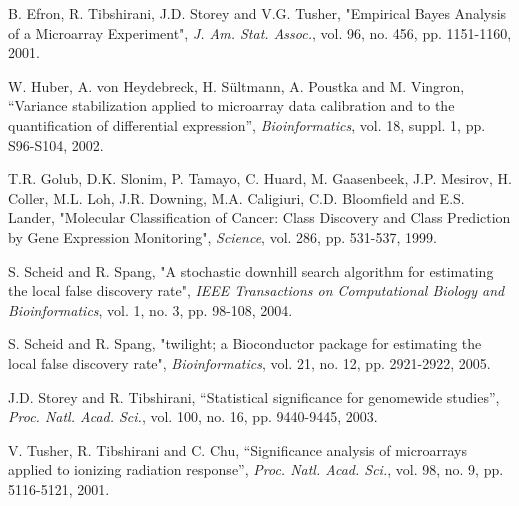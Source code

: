 \documentclass[11pt,a4paper,fleqn]{report}
\begin{document}
\begin{thebibliography}{1}

B. Efron, R. Tibshirani, J.D. Storey and V.G. Tusher, "Empirical Bayes Analysis of a Microarray Experiment", \emph{J. Am. Stat. Assoc.}, vol. 96, no. 456, pp. 1151-1160, 2001.

W. Huber, A. von Heydebreck, H. S{\"u}ltmann, A. Poustka and M. Vingron, ``Variance stabilization applied to microarray data calibration and to the quantification of differential expression'', \emph{Bioinformatics}, vol. 18, suppl. 1, pp. S96-S104, 2002.

T.R. Golub, D.K. Slonim, P. Tamayo, C. Huard, M. Gaasenbeek, J.P. Mesirov, H. Coller, M.L. Loh, J.R. Downing, M.A. Caligiuri, C.D. Bloomfield and E.S. Lander, "Molecular Classification of Cancer: Class Discovery and Class Prediction by Gene Expression Monitoring", \emph{Science}, vol. 286, pp. 531-537, 1999.

S. Scheid and R. Spang, "A stochastic downhill search algorithm for estimating the local false discovery rate", \emph{IEEE Transactions on Computational Biology and Bioinformatics}, vol. 1, no. 3, pp. 98-108, 2004.

S. Scheid and R. Spang, "twilight; a Bioconductor package for estimating the local false discovery rate", \emph{Bioinformatics}, vol. 21, no. 12, pp. 2921-2922, 2005.
       
J.D. Storey and R. Tibshirani, ``Statistical significance for genomewide studies'', \textit{Proc. Natl. Acad. Sci.}, vol. 100, no. 16, pp. 9440-9445, 2003.

V. Tusher, R. Tibshirani and C. Chu, ``Significance analysis of microarrays applied to ionizing radiation response'', \textit{Proc. Natl. Acad. Sci.}, vol. 98, no. 9, pp. 5116-5121, 2001.

\end{thebibliography}
\end{document}
